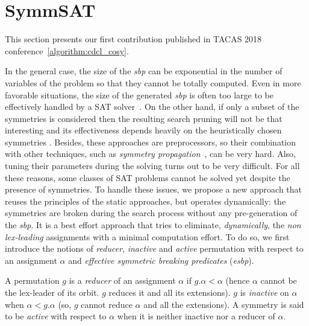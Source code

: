 \chapter{SymmSAT}\label{chap:symmSAT}


This section presents our first contribution published in TACAS 2018 conference~\ref{algorithm:cdcl_cosy}. 

In the general case,
the size of the \textit{sbp} can be exponential in the number of variables of
the problem so that they cannot be totally computed. Even in more favorable
situations, the size of the generated \textit{sbp} is often too large to be
effectively handled by a SAT solver~\cite{Luks2004}. On the other hand, if
only a subset of the symmetries is considered then the resulting search pruning
will not be that interesting and its effectiveness depends heavily on the
heuristically chosen symmetries \cite{biere2009handbook}. Besides, these approaches
are preprocessors, so their combination with other techniques, such as
\emph{symmetry propagation}~\cite{Devriendt12}, can be very hard. Also, tuning
their parameters during the solving turns out to be very difficult. For all
these reasons, some classes of SAT problems cannot be solved yet despite
the presence of symmetries.
To handle these issues, we propose a new
approach that reuses the principles of the static approaches, but operates
dynamically: the symmetries are broken during the search process without any
pre-generation of the \textit{sbp}. It is a best effort approach that tries to eliminate,
\textit{dynamically}, the \textit{non lex-leading} assignments with a minimal
computation effort. To do so, we first introduce the notions of
\textit{reducer}, \textit{inactive} and \textit{active} permutation with
respect to an assignment $\alpha$ and \emph{effective symmetric breaking predicates} (\emph{esbp}).


\begin{definition}
	 A permutation $g$	is a \emph{reducer} of an assignment $\alpha$ if $g.\alpha < \alpha$ 
	 (hence $\alpha$ cannot be the lex-leader of its orbit. $g$ reduces it and all its extensions). $g$ is
	\emph{inactive} on $\alpha$ when $\alpha < g.\alpha$ (so, $g$ cannot reduce $\alpha$ and all
	the extensions). A symmetry is said to be \emph{active} with respect to $\alpha$
	when it is neither inactive nor a reducer of $\alpha$. 
\end{definition}

